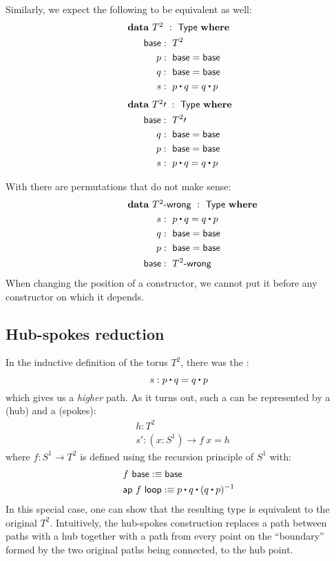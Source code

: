 \documentclass[a4paper,10pt]{report}
\begin{document}
Similarly, we expect the following to be equivalent as well:
%
\begin{alignat*}{2}
  &\rlap{$\data\ T^2\ :\ \Type\ \where$} \\
  &&\ \ \base     &:\ T^2 \\
  &&\ \ p         &:\ \base = \base \\
  &&\ \ q         &:\ \base = \base \\
  &&\ \ s         &:\ p \ct q = q \ct p
\end{alignat*}
%
\begin{alignat*}{2}
  &\rlap{$\data\ T^2 \prime\ :\ \Type\ \where$} \\
  &&\ \ \base     &:\ T^2 \prime \\
  &&\ \ q         &:\ \base = \base \\
  &&\ \ p         &:\ \base = \base \\
  &&\ \ s         &:\ p \ct q = q \ct p
\end{alignat*}

With \hits there are permutations that do not make sense:
\begin{alignat*}{2}
  &\rlap{$\data\ \toruswrong\ :\ \Type\ \where$} \\
  &&\ \ s         &:\ p \ct q = q \ct p \\
  &&\ \ q         &:\ \base = \base \\
  &&\ \ p         &:\ \base = \base \\
  &&\ \ \base     &:\ \toruswrong
\end{alignat*}
When changing the position of a constructor, we cannot put it before
any constructor on which it depends.

\subsection{Hub-spokes reduction}

In the inductive definition of the torus $T^2$, there was the \twoconstructor:
$$
s : p \ct q = q \ct p
$$
which gives us a \emph{higher} path. As it turns out, such a
\twoconstructor can be represented by a \zeroconstructor (hub)
and a \oneconstructor (spokes):
%
\begin{align*}
&h : T^2 \\
&s' : (x : S^1) \to f\ x = h
\end{align*}
%
where $f : S^1 \to T^2$ is defined using the recursion principle of
$S^1$ with:
%
\begin{align*}
  &f\ \base \ddefeq \base \\
  &\ap\ f\ \loopcstr \ddefeq p \ct q \ct (q \ct p)^{-1}
\end{align*}
%
In this special case, one can show that the resulting type is
equivalent to the original $T^2$. Intuitively, the hub-spokes
construction replaces a path between paths with a hub together with a
path from every point on the ``boundary'' formed by the two original
paths being connected, to the hub point.
\end{document}

